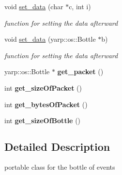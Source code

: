 \begin{DoxyCompactItemize}
\item 
void \hyperlink{classeventBottle_a75ea08df0fd8ce6cf8331678ef587413}{set\-\_\-data} (char $\ast$c, int i)
\begin{DoxyCompactList}\small\item\em function for setting the data afterward \end{DoxyCompactList}\item 
void \hyperlink{classeventBottle_ade587dd59d1a5f1a84de281b9aa119f5}{set\-\_\-data} (yarp\-::os\-::\-Bottle $\ast$b)
\begin{DoxyCompactList}\small\item\em function for setting the data afterward \end{DoxyCompactList}\item 
\hypertarget{classeventBottle_a59afc1ae08a0392ecd34fddff82319da}{yarp\-::os\-::\-Bottle $\ast$ {\bfseries get\-\_\-packet} ()}\label{classeventBottle_a59afc1ae08a0392ecd34fddff82319da}

\item 
\hypertarget{classeventBottle_a81a5715c8f7f59af32e792c77695dbac}{int {\bfseries get\-\_\-size\-Of\-Packet} ()}\label{classeventBottle_a81a5715c8f7f59af32e792c77695dbac}

\item 
\hypertarget{classeventBottle_ac0a84996be2cf4da895423d1b4d4632d}{int {\bfseries get\-\_\-bytes\-Of\-Packet} ()}\label{classeventBottle_ac0a84996be2cf4da895423d1b4d4632d}

\item 
\hypertarget{classeventBottle_ad80009e5ff12f9fc2611818ea3c12d42}{int {\bfseries get\-\_\-size\-Of\-Bottle} ()}\label{classeventBottle_ad80009e5ff12f9fc2611818ea3c12d42}

\end{DoxyCompactItemize}


\subsection{Detailed Description}
portable class for the bottle of events 

